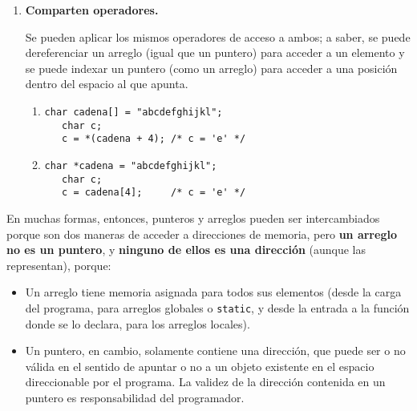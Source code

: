 \begin{enumerate}
\begin{enumerate}[label=\alph*.]
\item 
\begin{lstlisting}
char formato[] = "%d %d\n";
   fun(formato, 5, -1);
\end{lstlisting} 

\item 
\begin{lstlisting}
char *formato = "%d %d\n";
   fun(formato, 5, -1);
\end{lstlisting} 
\end{enumerate}


\item \textbf{Comparten operadores.}

Se pueden aplicar los mismos operadores de acceso a ambos; a saber, se puede
dereferenciar un arreglo (igual que un puntero) para acceder a un elemento y se
puede indexar un puntero (como un arreglo) para acceder a una posición dentro
del espacio al que apunta.

\begin{enumerate}[label=\alph*.]
\item 
\begin{lstlisting}
char cadena[] = "abcdefghijkl";
   char c;
   c = *(cadena + 4); /* c = 'e' */
\end{lstlisting} 

\item 
\begin{lstlisting}
char *cadena = "abcdefghijkl";
   char c;
   c = cadena[4];     /* c = 'e' */
\end{lstlisting} 
\end{enumerate}

\end{enumerate}



En muchas formas, entonces, punteros y arreglos pueden ser intercambiados
porque son dos maneras de acceder a direcciones de memoria, pero \textbf{un arreglo no
es un puntero}, y \textbf{ninguno de ellos es una dirección} (aunque las representan),
porque:

\begin{itemize}
	\item 
Un arreglo tiene memoria asignada para todos sus elementos (desde la carga
      del programa, para arreglos globales o \lstinline{static}, y desde la entrada a la
      función donde se lo declara, para los arreglos locales).
	\item 
Un puntero, en cambio, solamente contiene una dirección, que puede ser o
      no válida en el sentido de apuntar o no a un objeto existente en el
      espacio direccionable por el programa. La validez de la dirección
      contenida en un puntero es responsabilidad del programador.
\end{itemize}

